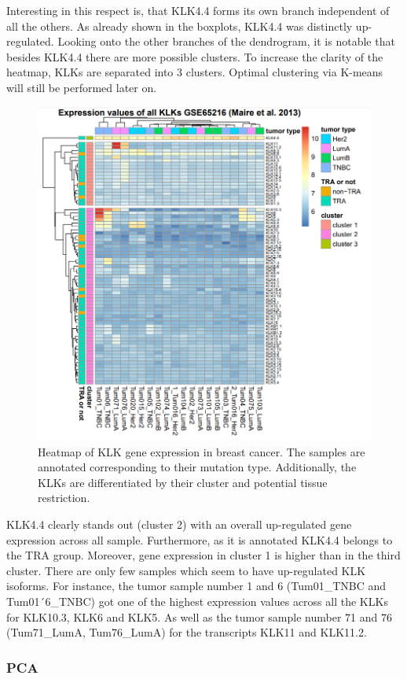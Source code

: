 \documentclass[
]{article}
\begin{document}
Interesting in this respect is, that KLK4.4 forms its own branch
independent of all the others. As already shown in the boxplots, KLK4.4
was distinctly up-regulated. Looking onto the other branches of the
dendrogram, it is notable that besides KLK4.4 there are more possible
clusters. To increase the clarity of the heatmap, KLKs are separated
into 3 clusters. Optimal clustering via K-means will still be performed
later on.\\

\begin{figure}

{\centering \includegraphics[width=0.5\linewidth]{images/Heatmap_breast} 

}

\caption{Heatmap of KLK gene expression in breast cancer. The samples are annotated corresponding to their mutation type. Additionally, the KLKs are differentiated by their cluster and potential tissue restriction.}\label{fig:Heatmap - breast }
\end{figure}

KLK4.4 clearly stands out (cluster 2) with an overall up-regulated gene
expression across all sample. Furthermore, as it is annotated KLK4.4
belongs to the TRA group. Moreover, gene expression in cluster 1 is
higher than in the third cluster. There are only few samples which seem
to have up-regulated KLK isoforms. For instance, the tumor sample number
1 and 6 (Tum01\_TNBC and Tum01´6\_TNBC) got one of the highest
expression values across all the KLKs for KLK10.3, KLK6 and KLK5. As
well as the tumor sample number 71 and 76 (Tum71\_LumA, Tum76\_LumA) for
the transcripts KLK11 and KLK11.2.

\hypertarget{pca}{%
\subsubsection{PCA}\label{pca}}
\end{document}
